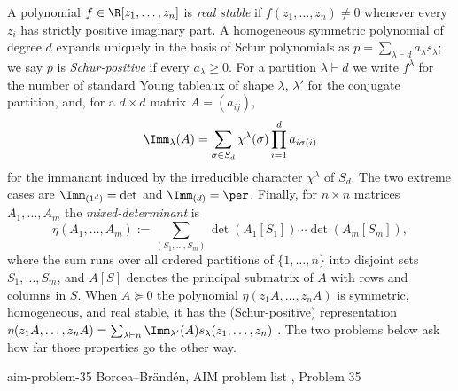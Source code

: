 

\begin{cxcredits}
\end{cxcredits}

\begin{cxcontext}
A polynomial $f\in\R[z_1,\ldots,z_n]$ is \emph{real stable} if $f(z_1,\ldots,z_n)\ne0$ whenever every $z_i$ has strictly positive imaginary part.  A homogeneous symmetric polynomial of degree $d$ expands uniquely in the basis of Schur polynomials as $p=\sum_{\lambda\vdash d}a_\lambda s_\lambda$; we say $p$ is \emph{Schur-positive} if every $a_\lambda\ge0$.  For a partition $\lambda\vdash d$ we write $f^\lambda$ for the number of standard Young tableaux of shape $\lambda$, $\lambda'$ for the conjugate partition, and, for a $d\times d$ matrix $A=(a_{ij})$,
\[
\Imm_\lambda(A)=\sum_{\sigma\in S_d}\chi^\lambda(\sigma)\prod_{i=1}^da_{i\sigma(i)}
\]
for the immanant induced by the irreducible character $\chi^\lambda$ of $S_d$. The two extreme cases are $\Imm_{(1^d)}=\det$ and $\Imm_{(d)}=\per$.  Finally, for $n\times n$ matrices $A_1,\ldots,A_m$ the \emph{mixed-determinant} is
\[
\eta(A_1,\ldots,A_m) :=\sum_{(S_1,\ldots,S_m)}\det(A_1[S_1])\cdots\det(A_m[S_m]),
\]
where the sum runs over all ordered partitions of $\{1,\ldots,n\}$ into disjoint sets $S_1,\ldots,S_m$, and $A[S]$ denotes the principal submatrix of $A$ with rows and columns in $S$.  When $A\succeq0$ the polynomial $\eta(z_1A,\ldots,z_nA)$ is symmetric, homogeneous, and real stable, it has the (Schur-positive) representation $\eta(z_1A,\ldots,z_nA)=\sum_{\lambda\vdash n}\Imm_{\lambda'}(A)s_\lambda(z_1,\ldots,z_n)$ \cite{AIMStableProblems}.  The two problems below ask how far those properties go the other way.
\end{cxcontext}


\begin{cxsource}{aim-problem-35}
Borcea--Br\"and\'en, AIM problem list \citeyearpar{AIMStableProblems}, Problem 35
\end{cxsource}

